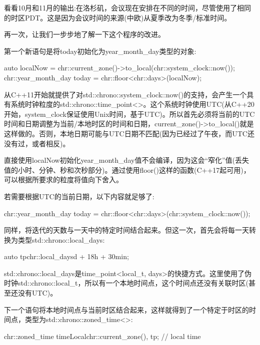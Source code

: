 看看10月和11月的输出:在洛杉矶，会议现在安排在不同的时间，尽管使用了相同的时区PDT。这是因为会议时间的来源(中欧)从夏季改为冬季/标准时间。

再一次，让我们一步步地了解一下这个程序的改进。


第一个新语句是将today初始化为year\_month\_day类型的对象:

\begin{cpp}
auto localNow = chr::current_zone()->to_local(chr::system_clock::now());
chr::year_month_day today = chr::floor<chr::days>(localNow);
\end{cpp}

从C++11开始就提供了对std::chrono::system\_clock::now()的支持，会产生一个具有系统时钟粒度的std::chrono::time\_point<>。这个系统时钟使用UTC(从C++20开始，system\_clock保证使用Unix时间，基于UTC)。所以首先必须将当前的UTC时间和日期调整为当前/本地时区的时间和日期，current\_zone()->to\_local()就是这样做的。否则，本地日期可能与UTC日期不匹配(因为已经过了午夜，而UTC还没有过，或者相反)。

直接使用localNow初始化year\_month\_day值不会编译，因为这会“窄化”值(丢失值的小时、分钟、秒和次秒部分)。通过使用floor()这样的函数(C++17起可用)，可以根据所要求的粒度将值向下舍入。

若需要根据UTC的当前日期，以下内容就足够了:

\begin{cpp}
chr::year_month_day today = chr::floor<chr::days>(chr::system_clock::now());
\end{cpp}


同样，将迭代的天数与一天中的特定时间结合起来。但这一次，首先会将每一天转换为类型std::chrono::local\_days:

\begin{cpp}
auto tp{chr::local_days{d} + 18h + 30min};
\end{cpp}

std::chrono::local\_days是time\_point<local\_t, days>的快捷方式。这里使用了伪时钟std::chrono::local\_t，所以有一个本地时间点，这个时间点还没有关联时区(甚至还没有UTC)。

下一个语句将本地时间点与当前时区结合起来，这样就得到了一个特定于时区的时间点，类型为std::chrono::zoned\_time<>:

\begin{cpp}
chr::zoned_time timeLocal{chr::current_zone(), tp}; // local time
\end{cpp}

